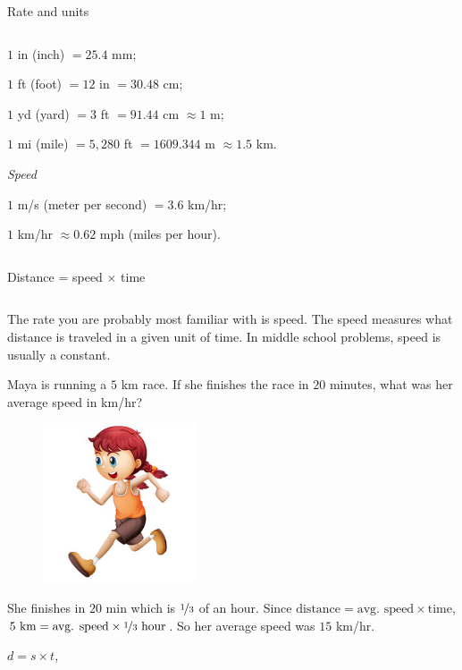 \documentclass[9pt,aspectratio=169]{beamer}
\begin{document}
\begin{frame}{Rate and units}
\begin{columns}[T]
\begin{column}{0.5\textwidth}
      $1$ in (inch) $= 25{.}4$ mm;

      $1$ ft (foot) $= 12$ in $= 30{.}48$ cm;

      $1$ yd (yard) $= 3$ ft $= 91{.}44$ cm $\approx 1$ m;

      $1$ mi (mile) $= 5{,}280$ ft $= 1609{.}344$ m $\approx 1{.}5$ km.\smallskip

      \emph{Speed}

      $1$ m/s (meter per second) $= 3{.}6$ km/hr;

      $1$ km/hr $\approx 0{.}62$ mph (miles per hour).
    \end{column}
  \end{columns}
\end{frame}

\begin{frame}{Distance = speed × time}
  \begin{columns}[T]
    \begin{column}{0.5\textwidth}
      The rate you are probably most familiar with is speed. The speed measures what distance is traveled in a given unit of time.  In middle school problems, speed is usually a constant.
      \begin{problem}
        Maya is running a $5$ km race.  If she finishes the race in $20$ minutes, what was her average speed in km/hr?
      \end{problem}
      \begin{figure}
        \vspace*{-1.3em}\hspace*{-2em}
        \includegraphics[width=0.4\textwidth]{09 - Rate/run.png}
      \end{figure}
      She finishes in $20$ min which is $\nicefrac{1}{3}$ of an hour.  Since $\text{distance} = \text{avg. speed} \times \text{time}$, $5\text{ km} = \text{avg. speed} \times \nicefrac{1}{3}\text{ hour}$. So her average speed was $15$ km/hr.
      \vspace*{2\baselineskip}
      \begin{definition}
        {\centering 
        $d = s \times t$,\par
        }
        

\end{definition}
\end{column}
\end{columns}
\end{frame}
\end{document}
